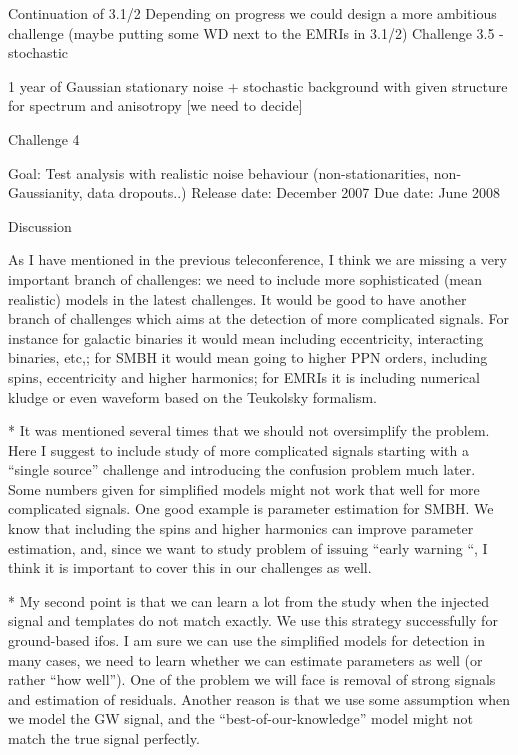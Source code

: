 \documentclass[11pt]{report}
\begin{document}
Continuation of 3.1/2
Depending on progress we could design a more ambitious challenge (maybe putting some WD next to the EMRIs in 3.1/2)
Challenge 3.5 - stochastic

1 year of Gaussian stationary noise + stochastic background with given structure for spectrum and anisotropy [we need to decide]


Challenge 4

Goal: Test analysis with realistic noise behaviour (non-stationarities, non-Gaussianity, data dropouts..) 
Release date: December 2007 
Due date: June 2008 



Discussion


As I have mentioned in the previous teleconference, I think we are missing a very important branch of challenges: we need to include more sophisticated (mean realistic) models in the latest challenges. It would be good to have another branch of challenges which aims at the detection of more complicated signals. For instance for galactic binaries it would mean including eccentricity, interacting binaries, etc,; for SMBH it would mean going to higher PPN orders, including spins, eccentricity and higher harmonics; for EMRIs it is including numerical kludge or even waveform based on the Teukolsky formalism.

* It was mentioned several times that we should not oversimplify the problem. Here I suggest to include study of more complicated signals starting with a “single source” challenge and introducing the confusion problem much later. Some numbers given for simplified models might not work that well for more complicated signals. One good example is parameter estimation for SMBH. We know that including the spins and higher harmonics can improve parameter estimation, and, since we want to study problem of issuing “early warning “, I think it is important to cover this in our challenges as well.

* My second point is that we can learn a lot from the study when the injected signal and templates do not match exactly. We use this strategy successfully for ground-based ifos. I am sure we can use the simplified models for detection in many cases, we need to learn whether we can estimate parameters as well (or rather “how well”). One of the problem we will face is removal of strong signals and estimation of residuals. Another reason is that we use some assumption when we model the GW signal, and the “best-of-our-knowledge” model might not match the true signal perfectly.
\end{document}
